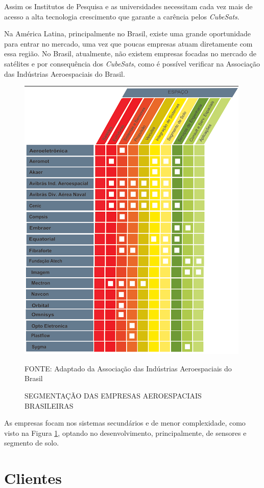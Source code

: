 \documentclass[
	12pt,				%
	openright,			%
	oneside,			%
	a4paper,			%
	english,			%
	french,				%
	spanish,			%
	brazil				%
	]{abntex2}
\begin{document}
	Assim os Institutos de Pesquisa e as universidades necessitam cada vez mais de acesso a alta tecnologia crescimento que garante a carência pelos \textit{CubeSats}.
		
	Na América Latina, principalmente no Brasil, existe uma grande oportunidade para entrar no mercado, uma vez que poucas empresas atuam diretamente com essa região. No Brasil, atualmente, não existem empresas focadas no mercado de satélites e por consequência dos \textit{CubeSats}, como é possível verificar na Associação das Indústrias Aeroespaciais do Brasil.
	
	\begin{figure}[th]
		\caption{SEGMENTAÇÃO DAS EMPRESAS AEROESPACIAIS BRASILEIRAS}
		\label{Segmentação}
		\centering
		\includegraphics[width=0.8\linewidth]{./figs/Figura_08}
			
		\begin{small}
			FONTE: Adaptado da Associação das Indústrias Aeroespaciais do Brasil
		\end{small}		
	\end{figure}
		
	As empresas focam nos sistemas secundários e de menor complexidade, como visto na Figura \ref{Segmentação}, optando no desenvolvimento, principalmente, de sensores e segmento de solo.
		
\section[Clientes]{Clientes}
\end{document}
